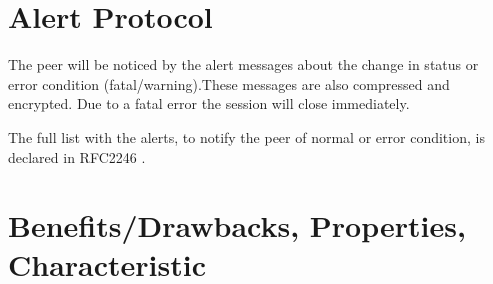 \section{Alert Protocol}
\label{sec:alert_protocol}
The peer will be noticed by the alert messages about the change in status or error condition (fatal/warning).These messages are also compressed and encrypted. Due to a fatal error the session will close immediately. 

The full list with the alerts, to notify the peer of normal or error condition, is declared in RFC2246 \cite{rfc2246}. \cite{W.Stalling} \cite{ms:overview}

\section{Benefits/Drawbacks, Properties, Characteristic}
\label{sec:introduction_suggestions}



